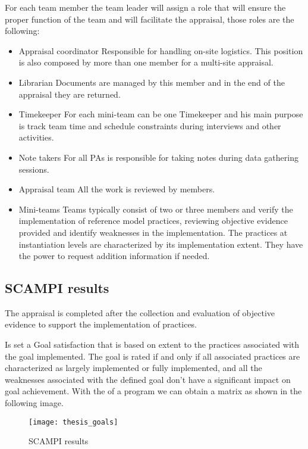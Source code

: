 For each team member the team leader will assign a role that will ensure the proper function of the team and will facilitate the appraisal, those roles are the following:
\begin{itemize}
	\item Appraisal coordinator
	\subitem Responsible for handling on-site logistics. This position is also composed by more than one member for a multi-site appraisal.
	\item Librarian
	\subitem Documents are managed by this member and in the end of the appraisal they are returned.
	\item Timekeeper
	\subitem For each mini-team can be one Timekeeper and his main purpose is track team time and schedule constraints during interviews and other activities.
	\item Note takers
	\subitem For all PAs is responsible for taking notes during data gathering sessions.
	\item Appraisal team
	\subitem All the work is reviewed by members.
	\item Mini-teams
	\subitem Teams typically consist of two or three members and verify the implementation of reference model practices, reviewing objective evidence provided and identify weaknesses in the implementation. The practices at instantiation levels are characterized by its implementation extent. They have the power to request addition information if needed. 
\end{itemize}

\subsection{SCAMPI results}

The appraisal is completed after the collection and evaluation of objective evidence to support the implementation of practices.

Is set a Goal satisfaction that is based on extent to the practices associated with the goal implemented. The goal is rated if and only if all associated practices are characterized as largely implemented or fully implemented, and all the weaknesses associated with the defined goal don't have a significant impact on goal achievement.
With the of a program we can obtain a matrix as shown in the following image.
 
\begin{figure}[h]
	\begin{center}
		\leavevmode
		\texttt{[image: thesis\_goals]}
		\caption{SCAMPI results}
		\label{fig:scampiresults}
	\end{center}
\end{figure}


